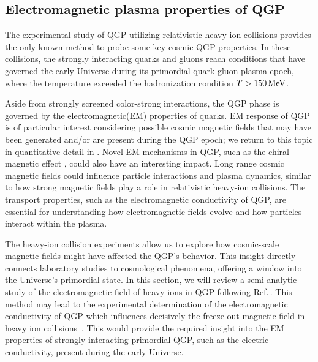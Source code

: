 \subsection{Electromagnetic plasma properties of QGP}\label{chap:QCD}
{\color{blue} The experimental study of QGP utilizing relativistic heavy-ion collisions provides the only known method to probe some key cosmic QGP properties. In these collisions, the strongly interacting quarks and gluons reach conditions that have governed the early Universe during its primordial quark-gluon plasma epoch, where the temperature exceeded the hadronization condition $T>150\text{\,MeV}$.} 

{\color{blue} Aside from strongly screened color-strong interactions, the QGP phase is governed by the electromagnetic(EM) properties of quarks. EM response of QGP is of particular interest considering possible cosmic magnetic fields that may have been generated and/or are present during the QGP epoch; we return to this topic in quantitative detail in . Novel EM mechanisms in QGP, such as the chiral magnetic effect \cite{Kharzeev:2007jp}, could also have an interesting impact. Long range cosmic magnetic fields could influence particle interactions and plasma dynamics, similar to how strong magnetic fields play a role in relativistic heavy-ion collisions. The transport properties, such as the electromagnetic conductivity of QGP, are essential for understanding how electromagnetic fields evolve and how particles interact within the plasma.}

{\color{blue} The heavy-ion collision experiments allow us to explore how cosmic-scale magnetic fields might have affected the QGP's behavior. This insight directly connects laboratory studies to cosmological phenomena, offering a window into the Universe’s primordial state. In this section, we will review a semi-analytic study of the electromagnetic field of heavy ions in QGP following Ref.\,\cite{Grayson:2022asf}. This method may lead to the experimental determination of the electromagnetic conductivity of QGP which influences decisively the freeze-out magnetic field in heavy ion collisions~\cite{STAR:2023jdd}. This would provide the required insight into the EM properties of strongly interacting primordial QGP, such as the electric conductivity, present during the early Universe.}

